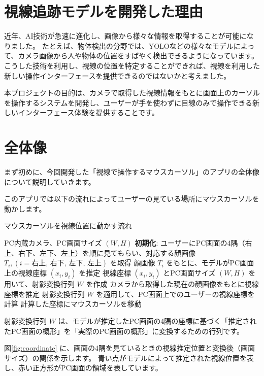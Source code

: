\section{視線追跡モデルを開発した理由}
近年、AI技術が急速に進化し、画像から様々な情報を取得することが可能になりました。
たとえば、物体検出の分野では、YOLOなどの様々なモデルによって、カメラ画像から人や物体の位置をすばやく検出できるようになっています。
こうした技術を利用し、視線の位置を特定することができれば、視線を利用した新しい操作インターフェースを提供できるのではないかと考えました。

本プロジェクトの目的は、カメラで取得した視線情報をもとに画面上のカーソルを操作するシステムを開発し、ユーザーが手を使わずに目線のみで操作できる新しいインターフェース体験を提供することです。

\section{全体像}
まず初めに、今回開発した「視線で操作するマウスカーソル」のアプリの全体像について説明していきます。

このアプリでは以下の流れによってユーザーの見ている場所にマウスカーソルを動かします。

\begin{algorithm}[H]
    \caption{マウスカーソルを視線位置に動かす流れ}
    \begin{algorithmic}[1]
        \Require PC内蔵カメラ、PC画面サイズ $(W, H)$
        \State \textbf{初期化}: ユーザーにPC画面の4隅（右上、右下、左下、左上）を順に見てもらい、対応する顔画像 $T_i , (i = \text{右上, 右下, 左下, 左上})$ を取得
        \State 顔画像 $T_i$ をもとに、モデルがPC画面上の視線座標 $(x_i, y_i)$ を推定
        \State 視線座標 $(x_i, y_i)$ とPC画面サイズ $(W, H)$ を用いて、射影変換行列 $W$ を作成
        \State カメラから取得した現在の顔画像をもとに視線座標を推定
        \State 射影変換行列 $W$ を適用して、PC画面上でのユーザーの視線座標を計算
        \State 計算した座標にマウスカーソルを移動
        \EndWhile
    \end{algorithmic}
\end{algorithm}

射影変換行列 $W$ は、モデルが推定したPC画面の4隅の座標に基づく「推定されたPC画面の概形」を「実際のPC画面の概形」に変換するための行列です。

図\ref{fig:coordinate} に、画面の4隅を見ているときの視線推定位置と変換後（画面サイズ）の関係を示します。  
青い点がモデルによって推定された視線位置を表し、赤い正方形がPC画面の領域を表しています。

